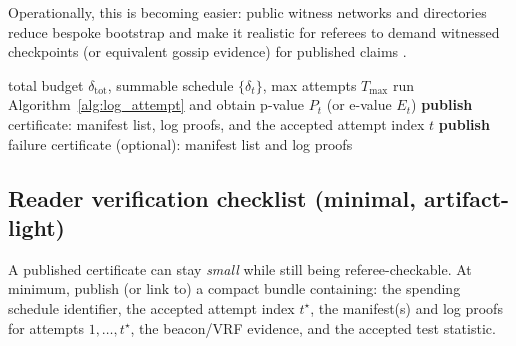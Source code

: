 \documentclass[11pt]{article}
\begin{document}
Operationally, this is becoming easier: public witness networks and directories reduce bespoke bootstrap and make it realistic for referees to demand witnessed checkpoints (or equivalent gossip evidence) for published claims \cite{witness_network_blog_2024,trustfabric_witnesses_2025,filippo_keyserver_tlog_2025}.



\begin{algorithm}[t]
\caption{Notarized release gate (approve-once)}\label{alg:release_gate}
\begin{algorithmic}[1]
\Require total budget $\delta_{\text{tot}}$, summable schedule $\{\delta_t\}$, max attempts $T_{\max}$
  \State run Algorithm~\ref{alg:log_attempt} and obtain p-value $P_t$ (or e-value $E_t$)
     \State \textbf{publish} certificate: manifest list, log proofs, and the accepted attempt index $t$
     \State \Return
  \EndIf
\EndFor
\State \textbf{publish} failure certificate (optional): manifest list and log proofs
\end{algorithmic}
\end{algorithm}
\subsection{Reader verification checklist (minimal, artifact-light)}
A published certificate can stay \emph{small} while still being referee-checkable.
At minimum, publish (or link to) a compact bundle containing: the spending schedule identifier, the accepted attempt index $t^\star$,
the manifest(s) and log proofs for attempts $1,\dots,t^\star$, the beacon/VRF evidence, and the accepted test statistic.
\end{document}
